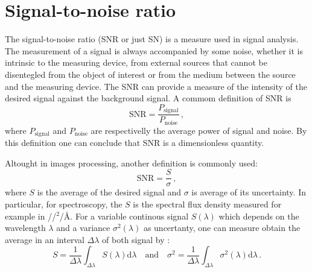 \documentclass[12pt, letterpaper, twoside]{article}
\begin{document}
\section{Signal-to-noise ratio}

The signal-to-noise ratio (SNR or just SN) is a measure used in signal analysis. The measurement of a signal is always accompanied by some noise, whether it is intrinsic to the measuring device, from external sources that cannot be disentegled from the object of interest or from the medium between the source and the measuring device. The SNR can provide a measure of the intensity of the desired signal against the background signal. A commom definition of SNR is
\begin{equation}
	\label{eq:snr_commom_def}
	\text{SNR} = \frac{P_{\text{signal}}}{P_{\text{noise}}} \, ,
\end{equation}
where $P_{\text{signal}}$ and $P_{\text{noise}}$ are respectivelly the average power of signal and noise. By this definition one can conclude that SNR is a dimensionless quantity.

Altought in images processing, another definition is commonly used: 
\begin{equation}
	\label{eq:snr_image_def}
	\text{SNR} = \frac{S}{\sigma} \, ,
\end{equation}
where $S$ is the average of the desired signal and $\sigma$ is average of its uncertainty. In particular, for spectroscopy, the $S$ is the spectral flux density measured for example in \erg/\s/\cm$^{2}$/\AA. For a variable continous signal $S(\lambda)$ which depends on the wavelength $\lambda$ and a variance $\sigma^{2}(\lambda)$ as uncertanty, one can measure obtain the average in an interval $\Delta\lambda$ of both signal by \citep{cappellari+03}:
\begin{equation}
	\label{eq:avg_cont_signal}
	S = \dfrac{1}{\Delta\lambda}\int_{\Delta\lambda} S(\lambda)\mathrm{d}\lambda
	\quad \text{and} \quad
	\sigma^{2} = \dfrac{1}{\Delta\lambda}\int_{\Delta\lambda} \sigma^{2}(\lambda)\mathrm{d}\lambda \, .
\end{equation}
\end{document}
